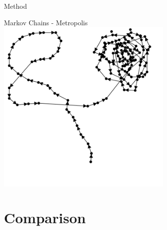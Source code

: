 \documentclass[t,10pt,fleqn]{beamer}
\begin{document}
\begin{frame}{Method}
	\vspace{-.3cm}
	\centering
	\begin{block}{Markov Chains - Metropolis}
		\includegraphics[width=0.65\textwidth]{mcmc-circling.png}
	\end{block}
\end{frame}



\section{Comparison}
\end{document}
